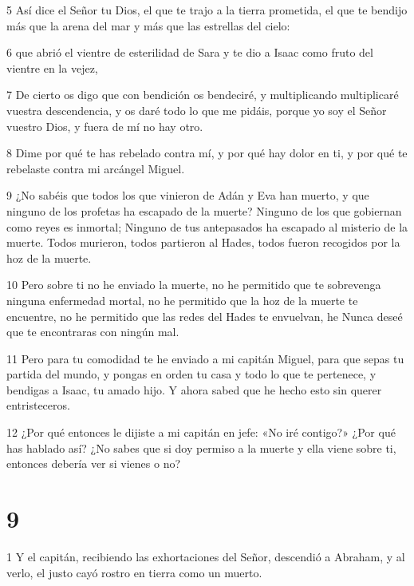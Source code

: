 \par 5 Así dice el Señor tu Dios, el que te trajo a la tierra prometida, el que te bendijo más que la arena del mar y más que las estrellas del cielo:

\par 6 que abrió el vientre de esterilidad de Sara y te dio a Isaac como fruto del vientre en la vejez,

\par 7 De cierto os digo que con bendición os bendeciré, y multiplicando multiplicaré vuestra descendencia, y os daré todo lo que me pidáis, porque yo soy el Señor vuestro Dios, y fuera de mí no hay otro.

\par 8 Dime por qué te has rebelado contra mí, y por qué hay dolor en ti, y por qué te rebelaste contra mi arcángel Miguel.

\par 9 ¿No sabéis que todos los que vinieron de Adán y Eva han muerto, y que ninguno de los profetas ha escapado de la muerte? Ninguno de los que gobiernan como reyes es inmortal; Ninguno de tus antepasados ​​ha escapado al misterio de la muerte. Todos murieron, todos partieron al Hades, todos fueron recogidos por la hoz de la muerte.

\par 10 Pero sobre ti no he enviado la muerte, no he permitido que te sobrevenga ninguna enfermedad mortal, no he permitido que la hoz de la muerte te encuentre, no he permitido que las redes del Hades te envuelvan, he Nunca deseé que te encontraras con ningún mal.

\par 11 Pero para tu comodidad te he enviado a mi capitán Miguel, para que sepas tu partida del mundo, y pongas en orden tu casa y todo lo que te pertenece, y bendigas a Isaac, tu amado hijo. Y ahora sabed que he hecho esto sin querer entristeceros.

\par 12 ¿Por qué entonces le dijiste a mi capitán en jefe: «No iré contigo?» ¿Por qué has hablado así? ¿No sabes que si doy permiso a la muerte y ella viene sobre ti, entonces debería ver si vienes o no?

\chapter{9}

\par 1 Y el capitán, recibiendo las exhortaciones del Señor, descendió a Abraham, y al verlo, el justo cayó rostro en tierra como un muerto.

